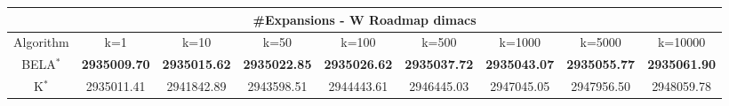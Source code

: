 \begin{tabular}{c|cccccccc}\toprule
\multicolumn{9}{c}{#Expansions - W Roadmap dimacs}\\ \midrule
Algorithm & k=1 & k=10 & k=50 & k=100 & k=500 & k=1000 & k=5000 & k=10000 \\ \midrule
BELA$^*$ & \textbf{2935009.70} & \textbf{2935015.62} & \textbf{2935022.85} & \textbf{2935026.62} & \textbf{2935037.72} & \textbf{2935043.07} & \textbf{2935055.77} & \textbf{2935061.90} \\
K$^*$ & 2935011.41 & 2941842.89 & 2943598.51 & 2944443.61 & 2946445.03 & 2947045.05 & 2947956.50 & 2948059.78 \\ \bottomrule 
\end{tabular}
